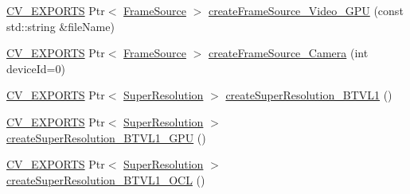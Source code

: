 \begin{DoxyCompactItemize}
\hyperlink{core_2types__c_8h_a1bf9f0e121b54272da02379cfccd0a2b}{C\-V\-\_\-\-E\-X\-P\-O\-R\-T\-S} Ptr$<$ \hyperlink{classcv_1_1superres_1_1FrameSource}{Frame\-Source} $>$ \hyperlink{namespacecv_1_1superres_a983ba51684cf6921a327c13f93231dc6}{create\-Frame\-Source\-\_\-\-Video\-\_\-\-G\-P\-U} (const std\-::string \&file\-Name)
\item 
\hyperlink{core_2types__c_8h_a1bf9f0e121b54272da02379cfccd0a2b}{C\-V\-\_\-\-E\-X\-P\-O\-R\-T\-S} Ptr$<$ \hyperlink{classcv_1_1superres_1_1FrameSource}{Frame\-Source} $>$ \hyperlink{namespacecv_1_1superres_a61335f9d5f497b3f4b23e567c5671638}{create\-Frame\-Source\-\_\-\-Camera} (int device\-Id=0)
\item 
\hyperlink{core_2types__c_8h_a1bf9f0e121b54272da02379cfccd0a2b}{C\-V\-\_\-\-E\-X\-P\-O\-R\-T\-S} Ptr$<$ \hyperlink{classcv_1_1superres_1_1SuperResolution}{Super\-Resolution} $>$ \hyperlink{namespacecv_1_1superres_a695b9afd67c05017dab2c748d24fb4ae}{create\-Super\-Resolution\-\_\-\-B\-T\-V\-L1} ()
\item 
\hyperlink{core_2types__c_8h_a1bf9f0e121b54272da02379cfccd0a2b}{C\-V\-\_\-\-E\-X\-P\-O\-R\-T\-S} Ptr$<$ \hyperlink{classcv_1_1superres_1_1SuperResolution}{Super\-Resolution} $>$ \hyperlink{namespacecv_1_1superres_a9e86ab21c93da3376113853f0fff5faa}{create\-Super\-Resolution\-\_\-\-B\-T\-V\-L1\-\_\-\-G\-P\-U} ()
\item 
\hyperlink{core_2types__c_8h_a1bf9f0e121b54272da02379cfccd0a2b}{C\-V\-\_\-\-E\-X\-P\-O\-R\-T\-S} Ptr$<$ \hyperlink{classcv_1_1superres_1_1SuperResolution}{Super\-Resolution} $>$ \hyperlink{namespacecv_1_1superres_abd2ddda9a4b4c5c02e9f832caa566b88}{create\-Super\-Resolution\-\_\-\-B\-T\-V\-L1\-\_\-\-O\-C\-L} ()
\end{DoxyCompactItemize}


